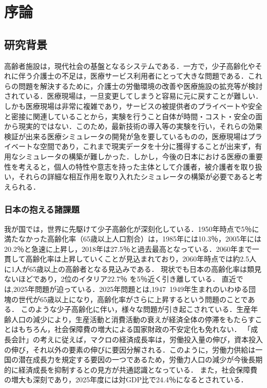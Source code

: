 \chapter{序論}

\section{研究背景}

高齢者施設は，現代社会の基盤となるシステムである．一方で，少子高齢化やそれに伴う介護士の不足は，医療サービス利用者にとって大きな問題である．これらの問題を解決するために，介護士の労働環境の改善や医療施設の拡充等が検討されている．医療現場は，一旦変更してしまうと容易に元に戻すことが難しい．しかも医療現場は非常に複雑であり，サービスの被提供者のプライベートや安全と密接に関連していることから，実験を行うこと自体が時間・コスト・安全の面から現実的ではない．このため，最新技術の導入等の実験を行い，それらの効果検証が出来る医療シミュレータの開発が急を要しているものの，医療現場はプライベートな空間であり，これまで現実データを十分に獲得することが出来ず，有用なシミュレータの構築が難しかった．しかし，今後の日本における医療の重要性を考えると，個人の特性や意志を持った主体として介護者，被介護者を取り扱い，それらの詳細な相互作用を取り入れたシミュレータの構築が必要であると考えられる．

\subsection{日本の抱える諸課題}

我が国では，世界に先駆けて少子高齢化が深刻化している．1950年時点で5％に満たなかった高齢化率（65歳以上人口割合）は，1985年には10.3％，2005年には20.2％と急速に上昇し，2018年は27.5％と過去最高となっている．2060年まで一貫して高齢化率は上昇していくことが見込まれており，2060年時点では約2.5人に1人が65歳以上の高齢者となる見込みである\cite{ex_kousei_v1}．
現状でも日本の高齢化率は類見ないほどであり，2位のイタリア22.7％ を5％近く引き離している．
直近では,2025年問題が迫っている．2025年問題とは,1947~1949年生まれのいわゆる団塊の世代が65歳以上になり，高齢化率がさらに上昇するという問題のことである．\cite{2025_problem}
このような少子高齢化に伴い，様々な問題が引き起こされている．生産年齢人口の減少により，生産活動と消費活動の衰えが経済全体の停滞をもたらすことはもちろん，社会保障費の増大による国家財政の不安定化も免れない．
「成長会計」の考えに従えば，マクロの経済成長率は，労働投入量の伸び，資本投入の伸び，それ以外の要素の伸びに要因分解される．このように，労働力供給は一国の潜在成長力を規定する要因の一つであるため，労働力人口の減少が今後長期的に経済成長を抑制するとの見方が共通認識となっている．\cite{population_GDP_relation}
また，社会保障費の増大も深刻であり，2025年度には対GDP比で24.4％になるとされている．\cite{social_security}

